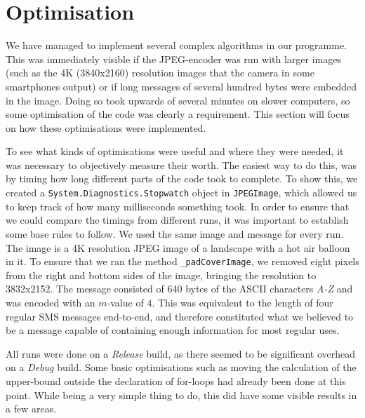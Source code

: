 \section{Optimisation}
We have managed to implement several complex algorithms in our programme.
This was immediately visible if the JPEG-encoder was run with larger images (such as the 4K (3840x2160) resolution images that the camera in some smartphones output) or if long messages of several hundred bytes were embedded in the image.
Doing so took upwards of several minutes on slower computers, so some optimisation of the code was clearly a requirement.
This section will focus on how these optimisations were implemented.

To see what kinds of optimisations were useful and where they were needed, it was necessary to objectively measure their worth.
The easiest way to do this, was by timing how long different parts of the code took to complete.
To show this, we created a \lstinline|System.Diagnostics.Stopwatch| object in \lstinline|JPEGImage|, which allowed us to keep track of how many milliseconds something took.
In order to ensure that we could compare the timings from different runs, it was important to establish some base rules to follow.
We used the same image and message for every run.
The image is a 4K resolution JPEG image of a landscape with a hot air balloon in it.
To ensure that we ran the method \lstinline|_padCoverImage|, we removed eight pixels from the right and bottom sides of the image, bringing the resolution to 3832x2152.
The message consisted of 640 bytes of the ASCII characters \textit{A-Z} and was encoded with an $m$-value of $4$.
This was equivalent to the length of four regular SMS messages end-to-end, and therefore constituted what we believed to be a message capable of containing enough information for most regular uses.

All runs were done on a \textit{Release} build, as there seemed to be significant overhead on a \textit{Debug} build.
Some basic optimisations such as moving the calculation of the upper-bound outside the declaration of for-loops had already been done at this point.
While being a very simple thing to do, this did have some visible results in a few areas.

